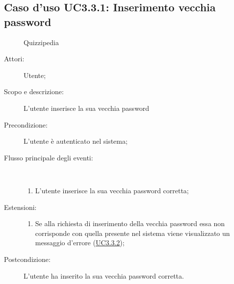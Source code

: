 \subsection{Caso d'uso UC3.3.1: Inserimento vecchia password}
	\begin{figure}[H]
		\centering
		\begin{resizedtikzpicture}{\textwidth}
		\begin{umlsystem}[x=0, fill=lightgray!20]{Quizzipedia}
		\end{umlsystem}
		\end{resizedtikzpicture}
		\caption{}
	\end{figure}
\begin{description}
\item[Attori:] Utente;
\item[Scopo e descrizione:] L'utente inserisce la sua vecchia password
      \item[Precondizione:] L'utente è autenticato nel sistema;

        \item[Flusso principale degli eventi:] \ 
 \begin{enumerate}
          \item L'utente inserisce la sua vecchia password corretta;

      \end{enumerate}
    \item[Estensioni:]
      \begin{enumerate}
          \item Se alla richiesta di inserimento della vecchia password essa non corrisponde con quella presente nel sistema viene visualizzato un messaggio d'errore (\hyperlink{UC3.3.2}{UC3.3.2});

      \end{enumerate}
    \item[Postcondizione:] L'utente ha inserito la sua vecchia password corretta.
  \end{description}
\hypertarget{UC3.3.2}{}

